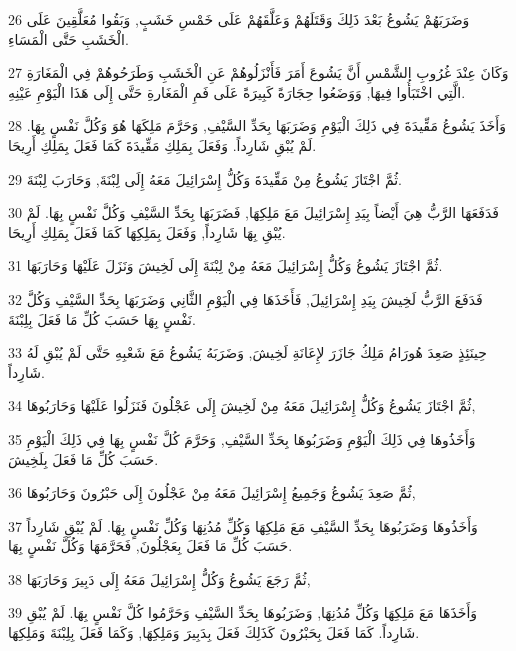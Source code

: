 \par 26 وَضَرَبَهُمْ يَشُوعُ بَعْدَ ذَلِكَ وَقَتَلَهُمْ وَعَلَّقَهُمْ عَلَى خَمْسِ خَشَبٍ, وَبَقُوا مُعَلَّقِينَ عَلَى الْخَشَبِ حَتَّى الْمَسَاءِ.
\par 27 وَكَانَ عِنْدَ غُرُوبِ الشَّمْسِ أَنَّ يَشُوعَ أَمَرَ فَأَنْزَلُوهُمْ عَنِ الْخَشَبِ وَطَرَحُوهُمْ فِي الْمَغَارَةِ الَّتِي اخْتَبَأُوا فِيهَا, وَوَضَعُوا حِجَارَةً كَبِيرَةً عَلَى فَمِ الْمَغَارةِ حَتَّى إِلَى هَذَا الْيَوْمِ عَيْنِهِ.
\par 28 وَأَخَذَ يَشُوعُ مَقِّيدَةَ فِي ذَلِكَ الْيَوْمِ وَضَرَبَهَا بِحَدِّ السَّيْفِ, وَحَرَّمَ مَلِكَهَا هُوَ وَكُلَّ نَفْسٍ بِهَا. لَمْ يُبْقِ شَارِداً. وَفَعَلَ بِمَلِكِ مَقِّيدَةَ كَمَا فَعَلَ بِمَلِكِ أَرِيحَا.
\par 29 ثُمَّ اجْتَازَ يَشُوعُ مِنْ مَقِّيدَةَ وَكُلُّ إِسْرَائِيلَ مَعَهُ إِلَى لِبْنَةَ, وَحَارَبَ لِبْنَةَ.
\par 30 فَدَفَعَهَا الرَّبُّ هِيَ أَيْضاً بِيَدِ إِسْرَائِيلَ مَعَ مَلِكِهَا, فَضَرَبَهَا بِحَدِّ السَّيْفِ وَكُلَّ نَفْسٍ بِهَا. لَمْ يُبْقِ بِهَا شَارِداً, وَفَعَلَ بِمَلِكِهَا كَمَا فَعَلَ بِمَلِكِ أَرِيحَا.
\par 31 ثُمَّ اجْتَازَ يَشُوعُ وَكُلُّ إِسْرَائِيلَ مَعَهُ مِنْ لِبْنَةَ إِلَى لَخِيشَ وَنَزَلَ عَلَيْهَا وَحَارَبَهَا.
\par 32 فَدَفَعَ الرَّبُّ لَخِيشَ بِيَدِ إِسْرَائِيلَ, فَأَخَذَهَا فِي الْيَوْمِ الثَّانِي وَضَرَبَهَا بِحَدِّ السَّيْفِ وَكُلَّ نَفْسٍ بِهَا حَسَبَ كُلِّ مَا فَعَلَ بِلِبْنَةَ.
\par 33 حِينَئِذٍ صَعِدَ هُورَامُ مَلِكُ جَازَرَ لإِعَانَةِ لَخِيشَ, وَضَرَبَهُ يَشُوعُ مَعَ شَعْبِهِ حَتَّى لَمْ يُبْقِ لَهُ شَارِداً.
\par 34 ثُمَّ اجْتَازَ يَشُوعُ وَكُلُّ إِسْرَائِيلَ مَعَهُ مِنْ لَخِيشَ إِلَى عَجْلُونَ فَنَزَلُوا عَلَيْهَا وَحَارَبُوهَا,
\par 35 وَأَخَذُوهَا فِي ذَلِكَ الْيَوْمِ وَضَرَبُوهَا بِحَدِّ السَّيْفِ, وَحَرَّمَ كُلَّ نَفْسٍ بِهَا فِي ذَلِكَ الْيَوْمِ حَسَبَ كُلِّ مَا فَعَلَ بِلَخِيشَ.
\par 36 ثُمَّ صَعِدَ يَشُوعُ وَجَمِيعُ إِسْرَائِيلَ مَعَهُ مِنْ عَجْلُونَ إِلَى حَبْرُونَ وَحَارَبُوهَا,
\par 37 وَأَخَذُوهَا وَضَرَبُوهَا بِحَدِّ السَّيْفِ مَعَ مَلِكِهَا وَكُلِّ مُدُنِهَا وَكُلِّ نَفْسٍ بِهَا. لَمْ يُبْقِ شَارِداً حَسَبَ كُلِّ مَا فَعَلَ بِعَجْلُونَ, فَحَرَّمَهَا وَكُلَّ نَفْسٍ بِهَا.
\par 38 ثُمَّ رَجَعَ يَشُوعُ وَكُلُّ إِسْرَائِيلَ مَعَهُ إِلَى دَبِيرَ وَحَارَبَهَا,
\par 39 وَأَخَذَهَا مَعَ مَلِكِهَا وَكُلِّ مُدُنِهَا, وَضَرَبُوهَا بِحَدِّ السَّيْفِ وَحَرَّمُوا كُلَّ نَفْسٍ بِهَا. لَمْ يُبْقِ شَارِداً. كَمَا فَعَلَ بِحَبْرُونَ كَذَلِكَ فَعَلَ بِدَبِيرَ وَمَلِكِهَا, وَكَمَا فَعَلَ بِلِبْنَةَ وَمَلِكِهَا.
